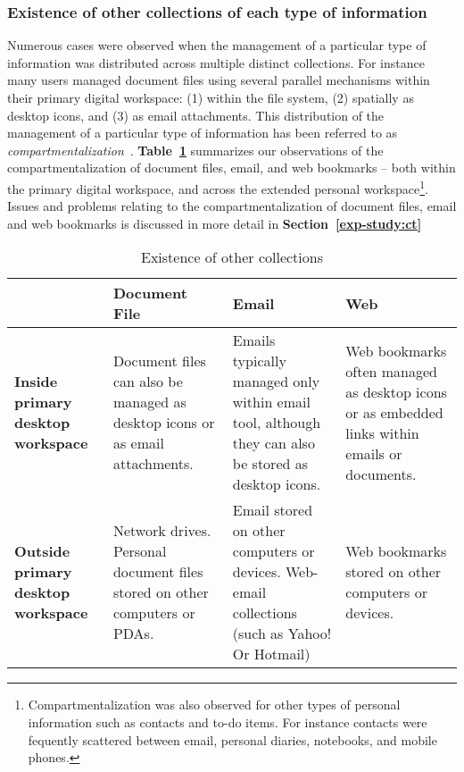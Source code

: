 \newpage
\subsubsection{Existence of other collections of each type of information}

Numerous cases were observed when the management of a particular type of information was distributed across multiple distinct collections.
For instance many users managed document files using several parallel mechanisms within their primary digital workspace: (1) within the file system, (2) spatially as desktop icons, and (3) as email attachments. 
This distribution of the management of a particular type of information has been referred to as \textit{compartmentalization}~\cite{Bellotti:00}. \textbf{Table~\ref{table:chapter3_other_collections}} summarizes our observations of the compartmentalization of document files, email, and web bookmarks -- both within the primary digital workspace, and across the extended personal workspace\footnote{Compartmentalization was also observed for other types of personal information such as contacts and to-do items.  For instance contacts were fequently scattered between email, personal diaries, notebooks, and mobile phones.}. Issues and problems relating to the compartmentalization of document files, email and web bookmarks is discussed in more detail in \textbf{Section~\ref{exp-study:ct}}



\begin{table}[h]
\begin{center}
\begin{footnotesize}
\begin{tabular}{|p{2.5cm}|p{3.5cm}|p{3.5cm}|p{3.5cm}|}
\hline
	& {\bf Document File} & {\bf Email} &  {\bf Web} \\
\hline \hline
{\bf Inside primary desktop workspace} & Document files can also be managed as desktop icons or as email attachments.  & Emails typically managed only within email tool, although they can also be stored as desktop icons. & Web bookmarks often managed as desktop icons or as embedded links within emails or documents.  \\
\hline
{\bf Outside primary desktop workspace} & Network drives. Personal document files stored on other computers or PDAs. & Email stored on other computers or devices. Web-email collections (such as Yahoo! Or Hotmail) & Web bookmarks stored on other computers or devices.  \\
\hline
\end{tabular}  
\end{footnotesize}
\caption{Existence of other collections}
\label{table:chapter3_other_collections}
\end{center}
\end{table}
\normalsize

